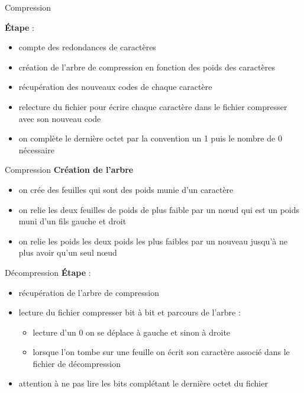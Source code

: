 \documentclass[french]{beamer}
\begin{document}
\begin{frame}{Compression}

	\textbf{Étape} :\\
	
\begin{itemize}
	\item compte des redondances de caractères
	\item création de l'arbre de compression en fonction des poids des caractères 
		
	\item récupération des nouveaux codes de chaque caractère
	\item relecture du fichier pour écrire chaque caractère dans le fichier compresser avec son nouveau code
	\item on complète le dernière octet par la convention un 1 puis le nombre de 0 nécessaire
	\end{itemize}

\end{frame}
\begin{frame}{Compression}
	\textbf{Création de l'arbre}	\\
	\begin{itemize}
			\item on crée des feuilles qui sont des poids munie d'un caractère
			\item on relie les deux feuilles de poids de plus faible par un nœud qui est un poids muni d'un fils gauche et droit
			\item on relie les poids les deux poids les plus faibles par un nouveau  jusqu'à ne plus avoir qu'un seul nœud
		\end{itemize}
\end{frame}
\begin{frame}{Décompression}
\textbf{Étape} :\\
\begin{itemize}
\item<1-5> récupération de l'arbre de compression
\item<2-5> lecture du fichier compresser bit à bit et parcours de l'arbre :
	\begin{itemize}
		\item<3-5> lecture d'un 0 on se déplace à gauche et sinon à droite
		\item<4-5> lorsque l'on tombe sur une feuille on écrit son caractère associé dans le fichier de décompression
	\end{itemize}
\item<5> attention à ne pas lire les bits complétant le dernière octet du fichier
\end{itemize}
\end{frame}
\end{document}

